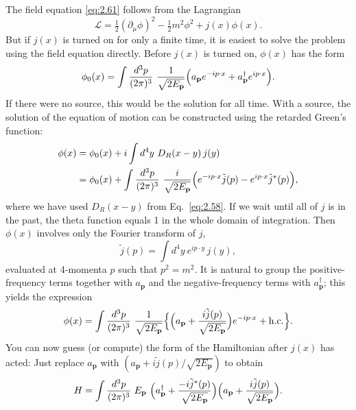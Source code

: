 The field equation \eqref{eq:2.61} follows from the Lagrangian
\begin{equation}
  \mathcal{L} = \tfrac{1}{2}(\partial_\mu\phi)^2 - \tfrac{1}{2}m^2\phi^2
    + j(x)\phi(x) .
  \label{eq:2.62}
\end{equation}
But if $j(x)$ is turned on for only a finite time, it is easiest to solve
the problem using the field equation directly.  Before $j(x)$ is turned
on, $\phi(x)$ has the form
\[
  \phi_0(x) = \int \frac{d^3p}{(2\pi)^3}\ \frac{1}{\sqrt{2E_{\mathbf{p}}}}
    \Bigl( a_{\mathbf{p}}e^{-ip\cdot x}
      + a_{\mathbf{p}}^\dagger e^{ip\cdot x} \Bigr).
\]
If there were no source, this would be the solution for all time.  With a
source, the solution of the equation of motion can be constructed using
the retarded Green's function:
\begin{align}
  \phi(x) &= \phi_0(x) + i\int d^4y\ D_R(x-y)\,j(y)\\
  &= \phi_0(x) + \int \frac{d^3p}{(2\pi)^3}\ \frac{i}{\sqrt{2E_{\mathbf{p}}}}
    \Bigl( e^{-ip\cdot x}\tilde{j}(p) - e^{ip\cdot x}\tilde{j}^{*}(p)
      \Bigr),
  \label{eq:2.63}
\end{align}
where we have used $D_R(x-y)$ from Eq.~\eqref{eq:2.58}.  If we wait until
all of $j$ is in the past, the theta function equals 1 in the whole domain
of integration.  Then $\phi(x)$ involves only the Fourier transform of
$j$,
\begin{equation}
  \tilde{j}(p) = \int d^4y\ e^{ip\cdot y}\,j(y),
\end{equation}
evaluated at 4-momenta $p$ such that $p^2=m^2$.  It is natural to group
the positive-frequency terms together with $a_{\mathbf{p}}$ and the
negative-frequency terms with $a_{\mathbf{p}}^\dagger$; this yields the
expression
\begin{equation}
  \phi(x) = \int \frac{d^3p}{(2\pi)^3}\ \frac{1}{\sqrt{2E_{\mathbf{p}}}}
    \Bigl\{ \Bigl( a_{\mathbf{p}}
      + \frac{i\tilde{j}(p)}{\sqrt{2E_{\mathbf{p}}}} \Bigr)e^{-ip\cdot x}
      + \mathrm{h.c.} \Bigr\}.
  \label{eq:2.64}
\end{equation}
You can now guess (or compute) the form of the Hamiltonian after $j(x)$
has acted: Just replace $a_{\mathbf{p}}$ with
$(a_{\mathbf{p}} + i\tilde{j}(p)/\sqrt{2E_{\mathbf{p}}})$ to obtain
\begin{equation}
  H = \int \frac{d^3p}{(2\pi)^3}\ E_{\mathbf{p}}\
    \Bigl( a_{\mathbf{p}}^\dagger
      + \frac{-i\tilde{j}^{*}(p)}{\sqrt{2E_{\mathbf{p}}}} \Bigr)
    \Bigl( a_{\mathbf{p}}
      + \frac{i\tilde{j}(p)}{\sqrt{2E_{\mathbf{p}}}} \Bigr) .
\end{equation}

